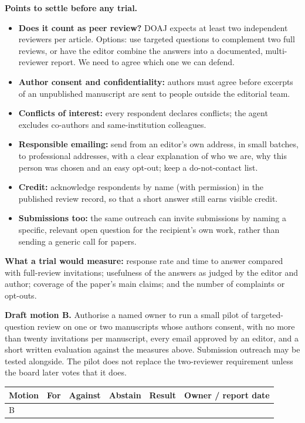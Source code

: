 \documentclass[11pt]{article}
\begin{document}
\textbf{Points to settle before any trial.}
\begin{itemize}
  \item \textbf{Does it count as peer review?} DOAJ expects at least two independent reviewers per article. Options: use targeted questions to complement two full reviews, or have the editor combine the answers into a documented, multi-reviewer report. We need to agree which one we can defend.
  \item \textbf{Author consent and confidentiality:} authors must agree before excerpts of an unpublished manuscript are sent to people outside the editorial team.
  \item \textbf{Conflicts of interest:} every respondent declares conflicts; the agent excludes co-authors and same-institution colleagues.
  \item \textbf{Responsible emailing:} send from an editor's own address, in small batches, to professional addresses, with a clear explanation of who we are, why this person was chosen and an easy opt-out; keep a do-not-contact list.
  \item \textbf{Credit:} acknowledge respondents by name (with permission) in the published review record, so that a short answer still earns visible credit.
  \item \textbf{Submissions too:} the same outreach can invite submissions by naming a specific, relevant open question for the recipient's own work, rather than sending a generic call for papers.
\end{itemize}

\textbf{What a trial would measure:} response rate and time to answer compared with full-review invitations; usefulness of the answers as judged by the editor and author; coverage of the paper's main claims; and the number of complaints or opt-outs.

\begin{solvebox}
\textbf{Draft motion B.} Authorise a named owner to run a small pilot of targeted-question review on one or two manuscripts whose authors consent, with no more than twenty invitations per manuscript, every email approved by an editor, and a short written evaluation against the measures above. Submission outreach may be tested alongside. The pilot does not replace the two-reviewer requirement unless the board later votes that it does.
\end{solvebox}

\begin{center}\small\sffamily
\begin{tabular}{@{}p{1.6cm}p{1.8cm}p{1.8cm}p{1.8cm}p{2cm}p{4cm}@{}}
\toprule
\textbf{Motion} & \textbf{For} & \textbf{Against} & \textbf{Abstain} & \textbf{Result} & \textbf{Owner / report date} \\
\midrule
B & & & & & \\[9pt]
\bottomrule
\end{tabular}
\end{center}
\end{document}
